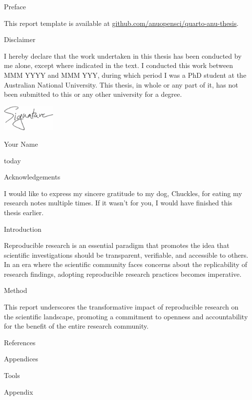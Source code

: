 \documentclass[
  a4paper,
  oneside,
  openany,
  12pt,
  onecolumn]{book}
\newlength{\cslhangindent}
\newenvironment{CSLReferences}[2] %
 {\begin{list}{}{%
  \setlength{\itemindent}{0pt}
  \setlength{\leftmargin}{0pt}
  \setlength{\parsep}{0pt}
  \ifodd #1
   \setlength{\leftmargin}{\cslhangindent}
   \setlength{\itemindent}{-1\cslhangindent}
  \fi
  \setlength{\itemsep}{#2\baselineskip}}}
 {\end{list}}
\renewcommand*\contentsname{Table of contents}
\newcommand\contentsname{Table of contents}
\begin{document}
\renewcommand*\contentsname{Table of contents}
{
\setcounter{tocdepth}{2}
\tableofcontents
}
\listoffigures
{}
\listoftables
{}
\mainmatter
Preface

This report template is available at
\href{https://github.com/anuopensci/quarto-anu-thesis}{github.com/anuopensci/quarto-anu-thesis}.

Disclaimer

I hereby declare that the work undertaken in this thesis has been
conducted by me alone, except where indicated in the text. I conducted
this work between MMM YYYY and MMM YYY, during which period I was a PhD
student at the Australian National University. This thesis, in whole or
any part of it, has not been submitted to this or any other university
for a degree.

\vspace{4cm}

\begin{flushright}
\includegraphics[width=0.2\textwidth,height=\textheight]{signature.png}

Your Name

today

\end{flushright}

Acknowledgements

I would like to express my sincere gratitude to my dog, Chuckles, for
eating my research notes multiple times. If it wasn't for you, I would
have finished this thesis earlier.

Introduction

Reproducible research is an essential paradigm that promotes the idea
that scientific investigations should be transparent, verifiable, and
accessible to others. In an era where the scientific community faces
concerns about the replicability of research findings, adopting
reproducible research practices becomes imperative.

Method

This report underscores the transformative impact of reproducible
research on the scientific landscape, promoting a commitment to openness
and accountability for the benefit of the entire research community.

References

\label{refs}
\begin{CSLReferences}{0}{1}
\end{CSLReferences}

Appendices

Tools

Appendix


\backmatter
\end{document}
